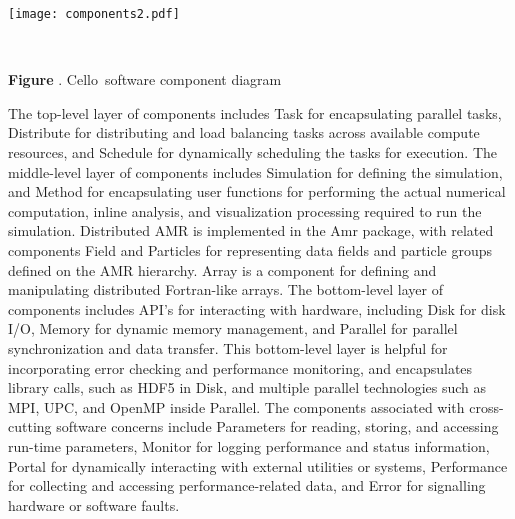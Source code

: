 \documentclass[11pt,letterpaper]{article}
\newcommand{\cello}{\textsf{Cello}}
\newcommand{\code}[1]{\textsf{#1}}
\newcounter{figctr}
\newcommand{\FIGURE}[3]{
\noindent
\parbox{\textwidth}{
\begin{center}
#3
\end{center}%
\ \nolinebreak%
\refstepcounter{figctr}%
\begin{center}%
\begin{minipage}{7.0in}
\textbf{Figure \thefigctr}. #1
\end{minipage}
\end{center}
\label{#2}
}}
\begin{document}
\FIGURE{\cello\ software component diagram}{f:components}{
\begin{minipage}{6in}
\begin{center}
\texttt{[image: components2.pdf]}
\end{center}
\end{minipage}}

The top-level layer of components includes \code{Task} for encapsulating parallel
tasks, \code{Distribute} for distributing and load balancing tasks
across available compute resources, and \code{Schedule} for
dynamically scheduling the tasks for execution.
%
The middle-level layer of components includes \code{Simulation} for
defining the simulation, and \code{Method} for encapsulating user
functions for performing the actual numerical computation, inline
analysis, and visualization processing required to run the simulation.
Distributed AMR is implemented in the \code{Amr} package, with related
components \code{Field} and \code{Particles} for representing data
fields and particle groups defined on the AMR hierarchy.  \code{Array}
is a component for defining and manipulating distributed Fortran-like
arrays.
%
The bottom-level layer of components includes API's for interacting
with hardware, including \code{Disk} for disk I/O, \code{Memory} for
dynamic memory management, and \code{Parallel} for parallel
synchronization and data transfer.  This bottom-level layer is helpful
for incorporating error checking and performance monitoring, and
encapsulates library calls, such as HDF5 in \code{Disk}, and multiple
parallel technologies such as MPI, UPC, and OpenMP inside
\code{Parallel}.
%
The components associated with cross-cutting software concerns include
\code{Parameters} for reading, storing, and accessing run-time
parameters, \code{Monitor} for logging performance and status
information, \code{Portal} for dynamically interacting with external
utilities or systems, \code{Performance} for collecting and accessing
performance-related data, and \code{Error} for signalling hardware or
software faults.

\end{document}
